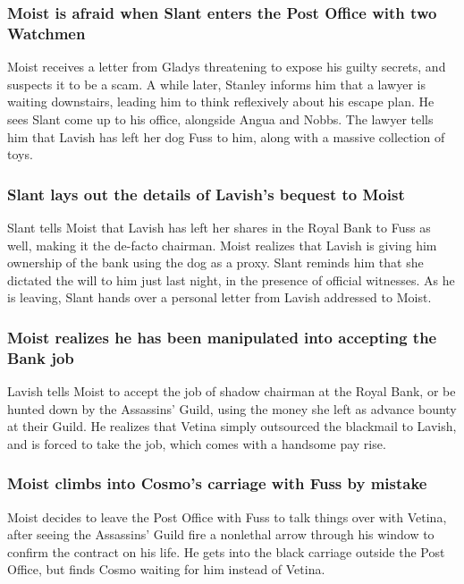 \subsubsection{\Gls{Moist} is afraid when \Gls{Slant} enters the Post Office with two Watchmen}
\Gls{Moist} receives a letter from \Gls{Gladys} threatening to expose his guilty secrets, and
suspects it to be a scam. A while later, \Gls{Stanley} informs him that a lawyer is waiting
downstairs, leading him to think reflexively about his escape plan. He sees \Gls{Slant} come up to
his office, alongside \Gls{Angua} and \Gls{Nobbs}. The lawyer tells him that \Gls{Lavish} has
left her dog \Gls{Fuss} to him, along with a massive collection of toys.

\subsubsection{\Gls{Slant} lays out the details of \Gls{Lavish}'s bequest to \Gls{Moist}}
\Gls{Slant} tells \Gls{Moist} that \Gls{Lavish} has left her shares in the Royal Bank to \Gls{Fuss}
as well, making it the de-facto chairman. \Gls{Moist} realizes that \Gls{Lavish} is giving him
ownership of the bank using the dog as a proxy. \Gls{Slant} reminds him that she dictated the will
to him just last night, in the presence of official witnesses. As he is leaving, \Gls{Slant} hands
over a personal letter from \Gls{Lavish} addressed to \Gls{Moist}.

\subsubsection{\Gls{Moist} realizes he has been manipulated into accepting the Bank job}
\Gls{Lavish} tells \Gls{Moist} to accept the job of shadow chairman at the Royal Bank, or be hunted
down by the Assassins' Guild, using the money she left as advance bounty at their Guild. He realizes
that \Gls{Vetina} simply outsourced the blackmail to \Gls{Lavish}, and is forced to take the job,
which comes with a handsome pay rise.

\subsubsection{\Gls{Moist} climbs into \Gls{Cosmo}'s carriage with \Gls{Fuss} by mistake}
\Gls{Moist} decides to leave the Post Office with \Gls{Fuss} to talk things over with \Gls{Vetina},
after seeing the Assassins' Guild fire a nonlethal arrow through his window to confirm the contract
on his life. He gets into the black carriage outside the Post Office, but finds \Gls{Cosmo}
waiting for him instead of \Gls{Vetina}.

